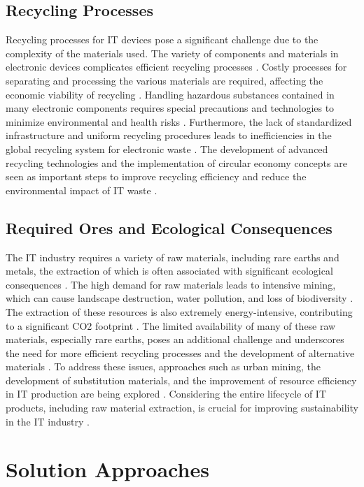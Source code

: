 \documentclass[10pt,twocolumn,conference]{IEEEtran}
\begin{document}
\subsection{Recycling Processes}
Recycling processes for IT devices pose a significant challenge due to the complexity of the materials used. The variety of components and materials in electronic devices complicates efficient recycling processes \cite{baldé2017}. Costly processes for separating and processing the various materials are required, affecting the economic viability of recycling \cite{tomlinson2010}. Handling hazardous substances contained in many electronic components requires special precautions and technologies to minimize environmental and health risks \cite{murugesan2008}. Furthermore, the lack of standardized infrastructure and uniform recycling procedures leads to inefficiencies in the global recycling system for electronic waste \cite{baldé2017}. The development of advanced recycling technologies and the implementation of circular economy concepts are seen as important steps to improve recycling efficiency and reduce the environmental impact of IT waste \cite{geissdoerfer2010}.

\subsection{Required Ores and Ecological Consequences}
The IT industry requires a variety of raw materials, including rare earths and metals, the extraction of which is often associated with significant ecological consequences \cite{unctad2019}. The high demand for raw materials leads to intensive mining, which can cause landscape destruction, water pollution, and loss of biodiversity \cite{tomlinson2010}. The extraction of these resources is also extremely energy-intensive, contributing to a significant CO2 footprint \cite{belkhir2018}. The limited availability of many of these raw materials, especially rare earths, poses an additional challenge and underscores the need for more efficient recycling processes and the development of alternative materials \cite{freitag2021}. To address these issues, approaches such as urban mining, the development of substitution materials, and the improvement of resource efficiency in IT production are being explored \cite{pohl2019}. Considering the entire lifecycle of IT products, including raw material extraction, is crucial for improving sustainability in the IT industry \cite{bieser2019}.

\section{Solution Approaches}
\end{document}
